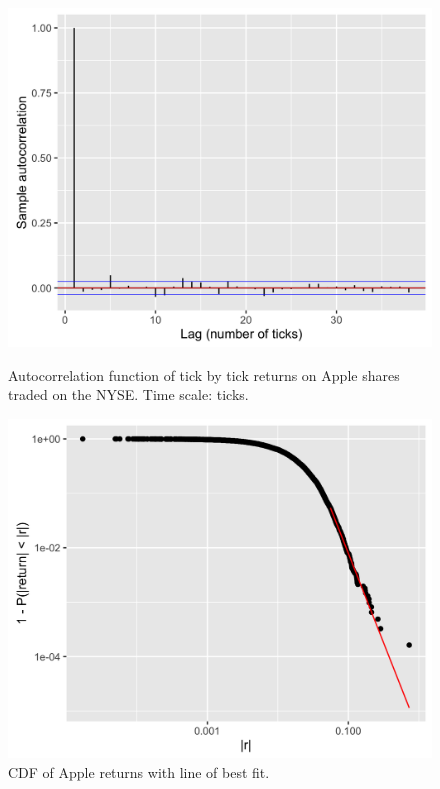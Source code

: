 \documentclass[letterpaper,12pt]{article}
\begin{document}
\begin{figure}[!tbp]
  \centering
  \begin{minipage}[t]{0.45\textwidth}
    \includegraphics[width=\textwidth]{fig1.png}
    \caption{Autocorrelation function of tick by tick returns on Apple shares traded on the NYSE. Time scale: ticks.\label{fig:fig1}}
  \end{minipage}
  \hfill
  \begin{minipage}[t]{0.45\textwidth}
    \includegraphics[width=\textwidth]{fig2.png}
    \caption{CDF of Apple returns with line of best fit.\label{fig:fig2}}
  \end{minipage}
\end{figure}
\end{document}
